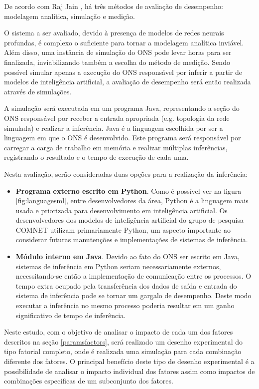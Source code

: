 De acordo com Raj Jain \cite{jain1991art}, há três métodos de avaliação de desempenho: modelagem analítica, simulação e medição.

O sistema a ser avaliado, devido à presença de modelos de redes neurais profundas, é complexo o suficiente para tornar a modelagem analítica inviável. Além disso, uma instância de simulação do ONS pode levar horas para ser finalizada, inviabilizando também a escolha do método de medição. Sendo possível simular apenas a execução do ONS responsável por inferir a partir de modelos de inteligência artificial, a avaliação de desempenho será então realizada através de simulações.

A simulação será executada em um programa Java, representando a seção do ONS responsável por receber a entrada apropriada (e.g. topologia da rede simulada) e realizar a inferência. Java é a linguagem escolhida por ser a linguagem em que o ONS é desenvolvido. Este programa será responsável por carregar a carga de trabalho em memória e realizar múltiplas inferências, registrando o resultado e o tempo de execução de cada uma.

Nesta avaliação, serão consideradas duas opções para a realização da inferência:

\begin{itemize}
  \item \textbf{Programa externo escrito em Python}. Como é possível ver na figura \ref{fig:languagesml}, entre desenvolvedores da área, Python é a linguagem mais usada e priorizada para desenvolvimento em inteligência artificial. Os desenvolvedores dos modelos de inteligência artificial do grupo de pesquisa COMNET utilizam primariamente Python, um aspecto importante ao considerar futuras manutenções e implementações de sistemas de inferência.
  \item \textbf{Módulo interno em Java}. Devido ao fato do ONS ser escrito em Java, sistemas de inferência em Python seriam necessariamente externos, necessitando-se então a implementação de comunicação entre os processos. O tempo extra ocupado pela transferência dos dados de saída e entrada do sistema de inferência pode se tornar um gargalo de desempenho. Deste modo executar a inferência no mesmo processo poderia resultar em um ganho significativo de tempo de inferência.
\end{itemize}

Neste estudo, com o objetivo de analisar o impacto de cada um dos fatores descritos na seção \ref{paramsfactors}, será realizado um desenho experimental do tipo fatorial completo, onde é realizada uma simulação para cada combinação diferente dos fatores. O principal benefício deste tipo de desenho experimental é a possibilidade de analisar o impacto individual dos fatores assim como impactos de combinações específicas de um subconjunto dos fatores.

